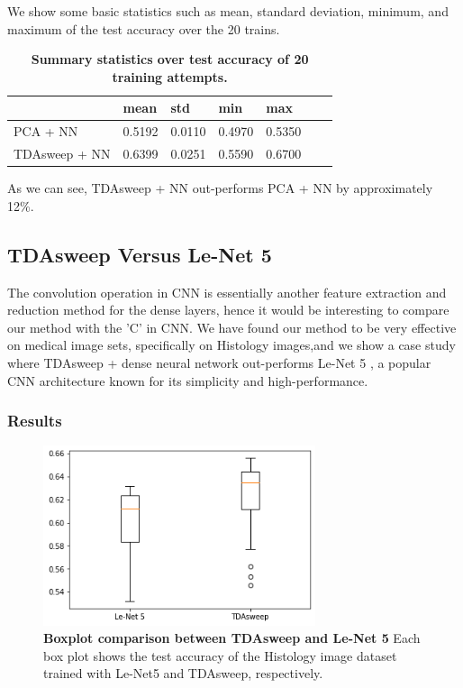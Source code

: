 \documentclass{article}
\begin{document}
We show some basic statistics such as mean, standard deviation, minimum, and maximum of the test accuracy over the 20 trains.
\begin{table}[!ht]
\centering
\caption{{\bf Summary statistics over test accuracy of 20 training attempts.}}
\begin{tabular}{|l|l|l|l|l|l|l|}
\hline
\multicolumn{1}{|l|}{} & \multicolumn{1}{|l|}{\bf mean} & \multicolumn{1}{|l|}{\bf std} & \multicolumn{1}{|l|}{\bf min}& \multicolumn{1}{|l|}{\bf max}\\ \hline
PCA + NN & 0.5192 & 0.0110 & 0.4970 & 0.5350 \\ \hline
TDAsweep + NN & 0.6399 & 0.0251 & 0.5590 & 0.6700 \\ \hline


\end{tabular}
\label{tda_aug}
\end{table}

As we can see, TDAsweep + NN out-performs PCA + NN by approximately 12\%.

\subsection{TDAsweep Versus Le-Net 5}
The convolution operation in CNN is essentially another feature extraction and reduction method for the dense layers, hence it would be interesting to compare our method with the 'C' in CNN. We have found our method to be very effective on medical image sets, specifically on Histology images,and we show a case study where TDAsweep + dense neural network out-performs Le-Net 5 \cite{lecun_bottou_bengio_haffner_1998}, a popular CNN architecture known for its simplicity and high-performance. 

\subsubsection{Results}

\begin{figure}[!ht]
\centering
\includegraphics[width=8cm]{lenet_vs_tdasweep.png}
\caption{{\bf Boxplot comparison between TDAsweep and Le-Net 5} Each box plot shows the test accuracy of the Histology image dataset trained with Le-Net5 and TDAsweep, respectively.}
\label{lenet_tdasweep}
\end{figure}
\end{document}
